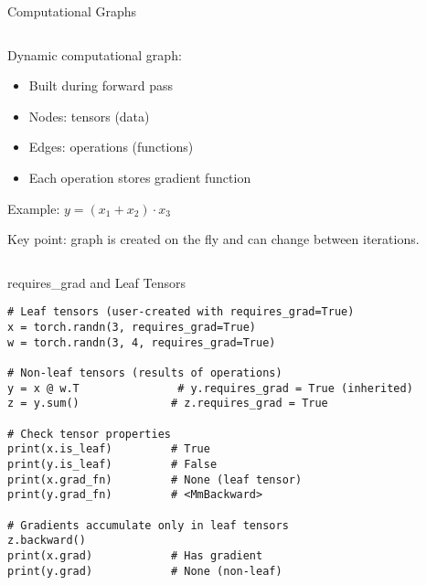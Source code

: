 \documentclass[aspectratio=169,10pt]{beamer}
\begin{document}
\begin{frame}{Computational Graphs}
\begin{columns}[T,onlytextwidth]

  \begin{column}{0.58\textwidth}
  Dynamic computational graph:
  \begin{itemize}
      \item Built during forward pass
      \item Nodes: tensors (data)
      \item Edges: operations (functions)
      \item Each operation stores gradient function
  \end{itemize}

  Example: $y = (x_1 + x_2)\cdot x_3$

  \medskip
  Key point: graph is created on the fly and can change between iterations.
  \end{column}

  \begin{column}{0.42\textwidth}
  \centering
  \end{column}

\end{columns}
\end{frame}

\begin{frame}[fragile]{requires\_grad and Leaf Tensors}
\begin{lstlisting}
# Leaf tensors (user-created with requires_grad=True)
x = torch.randn(3, requires_grad=True)
w = torch.randn(3, 4, requires_grad=True)

# Non-leaf tensors (results of operations)
y = x @ w.T               # y.requires_grad = True (inherited)
z = y.sum()              # z.requires_grad = True

# Check tensor properties
print(x.is_leaf)         # True
print(y.is_leaf)         # False
print(x.grad_fn)         # None (leaf tensor)
print(y.grad_fn)         # <MmBackward>

# Gradients accumulate only in leaf tensors
z.backward()
print(x.grad)            # Has gradient
print(y.grad)            # None (non-leaf)
\end{lstlisting}
\end{frame}
\end{document}

